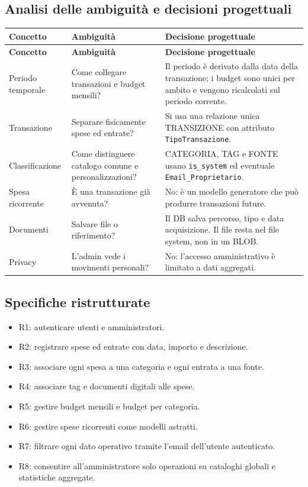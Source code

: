 \documentclass[11pt,a4paper]{article}
\begin{document}
\subsection{Analisi delle ambiguità e decisioni progettuali}
\begin{longtable}{p{3.5cm} p{5cm} p{6cm}}
\toprule
\textbf{Concetto} & \textbf{Ambiguità} & \textbf{Decisione progettuale} \\
\midrule
\endfirsthead
\toprule
\textbf{Concetto} & \textbf{Ambiguità} & \textbf{Decisione progettuale} \\
\midrule
\endhead
Periodo temporale & Come collegare transazioni e budget mensili? & Il periodo è derivato dalla data della transazione; i budget sono unici per ambito e vengono ricalcolati sul periodo corrente. \\
Transazione & Separare fisicamente spese ed entrate? & Si usa una relazione unica \textsc{TRANSIZIONE} con attributo \texttt{TipoTransazione}. \\
Classificazione & Come distinguere catalogo comune e personalizzazioni? & \textsc{CATEGORIA}, \textsc{TAG} e \textsc{FONTE} usano \texttt{is\_system} ed eventuale \texttt{Email\_Proprietario}. \\
Spesa ricorrente & È una transazione già avvenuta? & No: è un modello generatore che può produrre transazioni future. \\
Documenti & Salvare file o riferimento? & Il DB salva percorso, tipo e data acquisizione. Il file resta nel file system, non in un BLOB. \\
Privacy & L'admin vede i movimenti personali? & No: l'accesso amministrativo è limitato a dati aggregati. \\
\bottomrule
\end{longtable}

\subsection{Specifiche ristrutturate}
\begin{itemize}
    \item R1: autenticare utenti e amministratori.
    \item R2: registrare spese ed entrate con data, importo e descrizione.
    \item R3: associare ogni spesa a una categoria e ogni entrata a una fonte.
    \item R4: associare tag e documenti digitali alle spese.
    \item R5: gestire budget mensili e budget per categoria.
    \item R6: gestire spese ricorrenti come modelli astratti.
    \item R7: filtrare ogni dato operativo tramite l'email dell'utente autenticato.
    \item R8: consentire all'amministratore solo operazioni su cataloghi globali e statistiche aggregate.
\end{itemize}
\end{document}
